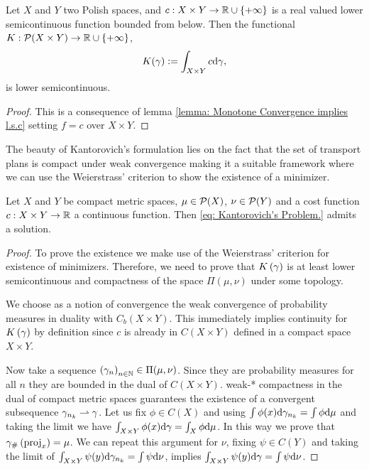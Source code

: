 \begin{theorem}
	Let $X$ and $Y$ two Polish spaces, and $c:X\times Y\rightarrow\mathbb{R}\cup\left\lbrace +\infty \right\rbrace$ is a real valued lower semicontinuous function bounded from below. Then the functional $K:\mathcal{P}(X\times Y)\rightarrow \mathbb{R}\cup\left\lbrace +\infty \right\rbrace$, 
	\begin{equation}
	K(\gamma):=\int_{X\times Y}c\mathrm{d}\gamma,
	\end{equation}
	is lower semicontinuous. \label{th: l.s.c of c.}
	\begin{proof}
		This is a consequence of lemma \ref{lemma: Monotone Convergence implies l.s.c} setting $f=c$ over $X\times Y$.
	\end{proof}

The beauty of Kantorovich's formulation lies on the fact that the set of transport plans is compact under weak convergence making it a suitable framework where we can use the Weierstrass' criterion to show the existence of a minimizer. 

\begin{theorem} Let $X$ and $Y$ be compact metric spaces, $\mu \in \mathcal{P}(X)$, $\nu \in \mathcal{P}(Y)$ and a cost function $c: X\times Y \rightarrow \mathbb{R}$ a continuous function. Then \eqref{eq: Kantorovich's Problem.} admits a solution.
\end{theorem}
\begin{proof}
	To prove the existence we make use of the Weierstrass’ criterion for existence of minimizers. Therefore, we need to prove that $K\left(\gamma\right)$ is at least lower semicontinuous and compactness of the space $\Pi(\mu, \nu)$ under some topology. 
	
	We choose as a notion of convergence the weak convergence of probability measures in duality with $C_b(X\times Y)$. This immediately implies continuity for $K\left(\gamma\right)$ by definition since $c$ is already in $C(X\times Y)$ defined in a compact space $X\times Y$. 
	
	Now take a sequence $\left( \gamma_n \right)_{n\in\mathbb{N}} \in \Pi(\mu, \nu)$. Since they are probability measures for all $n$ they are bounded in the dual of $C(X\times Y)$.  weak-* compactness in the dual of compact metric spaces guarantees the existence of a convergent subsequence $\gamma_{n_k} \rightharpoonup \gamma$. Let us fix $\phi \in C(X)$ and using $\int\phi(x) \mathrm{d} \gamma_{n_k}=\int \phi \mathrm{d}\mu$ and taking the limit we have $\int_{X\times Y}\phi(x) \mathrm{d} \gamma=\int_{X} \phi \mathrm{d}\mu$. In this way we prove that ${\gamma}_{\#} \left( \mathrm{proj}_x \right)=\mu$.  We can repeat this argument for $\nu$, fixing $\psi \in C(Y)$ and taking the limit of $\int_{X\times Y} \psi(y) \mathrm{d} \gamma_{n_k}=\int \psi \mathrm{d}\nu$, implies $\int_{X\times Y} \psi(y) \mathrm{d} \gamma=\int \psi \mathrm{d}\nu$. 
	

\end{proof}
\end{theorem}
